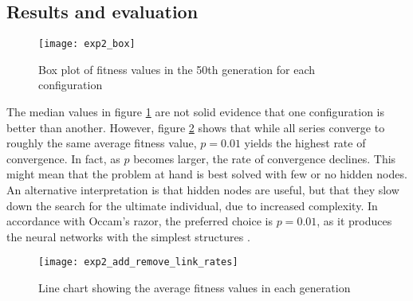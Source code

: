 \subsection{Results and evaluation}

\begin{figure}[H]
    \centering
    \texttt{[image: exp2\_box]}
    \caption{Box plot of fitness values in the 50th generation for each configuration}
    \label{fig:exp2_box}
\end{figure}

The median values in figure \ref{fig:exp2_box} are not solid evidence that one configuration is better than another. However, figure \ref{fig:exp2_add_remove_link_rates} shows that while all series converge to roughly the same average fitness value, $p=0.01$ yields the highest rate of convergence. In fact, as $p$ becomes larger, the rate of convergence declines. This might mean that the problem at hand is best solved with few or no hidden nodes. An alternative interpretation is that hidden nodes are useful, but that they slow down the search for the ultimate individual, due to increased complexity. In accordance with Occam's razor, the preferred choice is $p=0.01$, as it produces the neural networks with the simplest structures \citep{mitchell1997}.

\begin{figure}[H]
    \centering
    \texttt{[image: exp2\_add\_remove\_link\_rates]}
    \caption{Line chart showing the average fitness values in each generation}
    \label{fig:exp2_add_remove_link_rates}
\end{figure}

